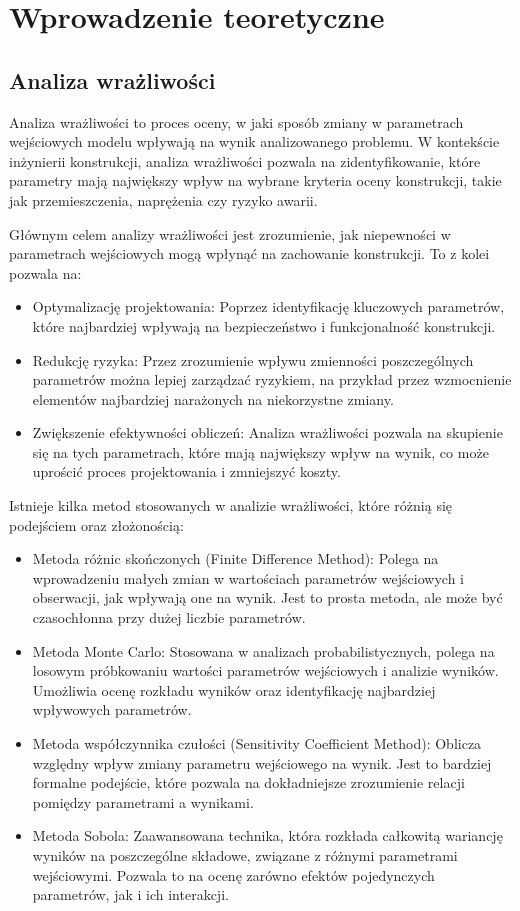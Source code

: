 \newpage
\section{Wprowadzenie teoretyczne}

\subsection{Analiza wrażliwości}

Analiza wrażliwości to proces oceny, w jaki sposób zmiany w parametrach wejściowych modelu wpływają na wynik analizowanego problemu.
W kontekście inżynierii konstrukcji, analiza wrażliwości pozwala na zidentyfikowanie, które parametry mają największy wpływ na wybrane kryteria oceny konstrukcji, takie jak przemieszczenia, naprężenia czy ryzyko awarii.

Głównym celem analizy wrażliwości jest zrozumienie, jak niepewności w parametrach wejściowych mogą wpłynąć na zachowanie konstrukcji. To z kolei pozwala na:

\begin{itemize}
    \item Optymalizację projektowania: Poprzez identyfikację kluczowych parametrów, które najbardziej wpływają na bezpieczeństwo i funkcjonalność konstrukcji.
    \item Redukcję ryzyka: Przez zrozumienie wpływu zmienności poszczególnych parametrów można lepiej zarządzać ryzykiem, na przykład przez wzmocnienie elementów najbardziej narażonych na niekorzystne zmiany.
    \item Zwiększenie efektywności obliczeń: Analiza wrażliwości pozwala na skupienie się na tych parametrach, które mają największy wpływ na wynik, co może uprościć proces projektowania i zmniejszyć koszty.
\end{itemize}

Istnieje kilka metod stosowanych w analizie wrażliwości, które różnią się podejściem oraz złożonością:

\begin{itemize}
    \item Metoda różnic skończonych (Finite Difference Method): Polega na wprowadzeniu małych zmian w wartościach parametrów wejściowych i obserwacji, jak wpływają one na wynik. Jest to prosta metoda, ale może być czasochłonna przy dużej liczbie parametrów.
    \item Metoda Monte Carlo: Stosowana w analizach probabilistycznych, polega na losowym próbkowaniu wartości parametrów wejściowych i analizie wyników. Umożliwia ocenę rozkładu wyników oraz identyfikację najbardziej wpływowych parametrów.
    \item Metoda współczynnika czułości (Sensitivity Coefficient Method): Oblicza względny wpływ zmiany parametru wejściowego na wynik. Jest to bardziej formalne podejście, które pozwala na dokładniejsze zrozumienie relacji pomiędzy parametrami a wynikami.
    \item Metoda Sobola: Zaawansowana technika, która rozkłada całkowitą wariancję wyników na poszczególne składowe, związane z różnymi parametrami wejściowymi. Pozwala to na ocenę zarówno efektów pojedynczych parametrów, jak i ich interakcji.
\end{itemize}

